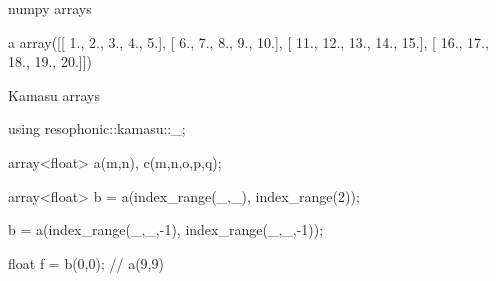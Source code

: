 \begin{frame}[fragile]{numpy arrays}
\begin{semiverbatim}\py a
array([[  1.,   \alert<4>{2.},   3.,   4.,   5.],
\alert<2>{       [  6.,   \alert<5-6>{\alert<4>{7.},   8.,   9.,}  10.],}
       [ 11.,  \alert<5-6>{\alert<4>{12.},  13.,  14.,}  15.],
\alert<3>{       [ 16.,  \alert<4>{17.},  18.,  19.,  20.]}])

\end{semiverbatim}
\end{frame}


\begin{frame}[fragile]{Kamasu arrays}
\begin{semiverbatim}
using resophonic::kamasu::_;

array<float> a(m,n), c(m,n,o,p,q); 

array<float> b = a(index_range(_,_), index_range(2));

b = a(index_range(_,_,-1), index_range(_,_,-1));

float f = b(0,0); // a(9,9)
\end{semiverbatim}
\end{frame}


